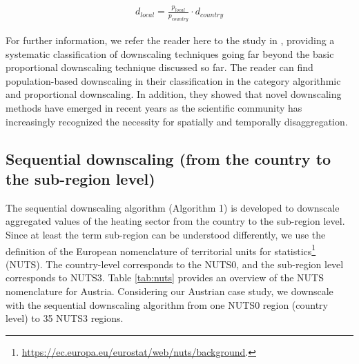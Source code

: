 \begin{align}\label{eq:1}
d_{local}=\frac{p_{local}}{p_{country}} \cdot d_{country}
\end{align}

For further information, we refer the reader here to the study in \cite{van2010downscaling}, providing a systematic classification of downscaling techniques going far beyond the basic proportional downscaling technique discussed so far. The reader can find population-based downscaling in their classification in the category algorithmic and proportional downscaling. In addition, they showed that novel downscaling methods have emerged in recent years as the scientific community has increasingly recognized the necessity for spatially and temporally disaggregation.

\subsection{Sequential downscaling (from the country to the sub-region level)}\label{alg1}
The sequential downscaling algorithm (Algorithm 1) is developed to downscale aggregated values of the heating sector from the country to the sub-region level. Since at least the term sub-region can be understood differently, we use the definition of the European nomenclature of territorial units for statistics\footnote{\url{https://ec.europa.eu/eurostat/web/nuts/background}.} (NUTS). The country-level corresponds to the NUTS0, and the sub-region level corresponds to NUTS3. Table \ref{tab:nuts} provides an overview of the NUTS nomenclature for Austria. Considering our Austrian case study, we downscale with the sequential downscaling algorithm from one NUTS0 region (country level) to \SI{35}{} NUTS3 regions.\vspace{0.3cm}

